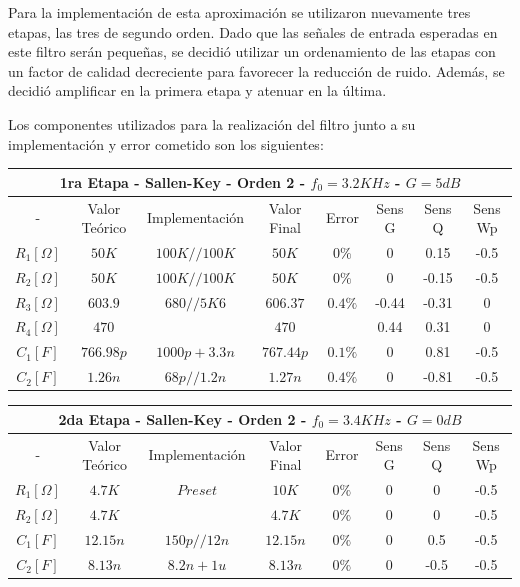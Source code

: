 Para la implementación de esta aproximación se utilizaron nuevamente tres etapas, las tres de segundo orden. Dado que las señales de entrada esperadas en este filtro serán pequeñas, se decidió utilizar un ordenamiento de las etapas con un factor de calidad decreciente para favorecer la reducción de ruido. Además, se decidió amplificar en la primera etapa y atenuar en la última.

Los componentes utilizados para la realización del filtro junto a su implementación y error cometido son los siguientes:

\begin{table}[H]
\centering
\begin{tabular}{@{}cccccccc@{}}
\multicolumn{8}{c}{1ra Etapa - Sallen-Key - Orden 2 - $f_0 = 3.2KHz$ - $G=5dB$} \\ \midrule
- & Valor Teórico & Implementación & Valor Final & Error & Sens G & Sens Q & Sens Wp \\ \midrule
$R_1 [\Omega]$ & $50K$ & $100K//100K$ & $50K$ & $0\%$ & 0 & 0.15 & -0.5 \\
$R_2 [\Omega]$ & $50K$ & $100K//100K$ & $50K$ & $0\%$ & 0 & -0.15 & -0.5 \\
$R_3 [\Omega]$ & $603.9$ & $680//5K6$ & $606.37$ & $0.4\%$ & -0.44 & -0.31 & 0 \\
$R_4 [\Omega]$ & $470$ &  & $470$ &  & 0.44 & 0.31 & 0 \\
$C_1 [F]$ & $766.98p$ & $1000p+3.3n$ & $767.44p$ & $0.1\%$ & 0 & 0.81 & -0.5 \\
$C_2 [F]$ & $1.26n$ & $68p//1.2n$ & $1.27n$ & $0.4\%$ & 0 & -0.81 & -0.5 \\ \bottomrule
\end{tabular}
\end{table}

\begin{table}[H]
\centering
\begin{tabular}{@{}cccccccc@{}}
\multicolumn{8}{c}{2da Etapa - Sallen-Key - Orden 2 - $f_0 = 3.4KHz$ - $G=0dB$} \\ \midrule
- & Valor Teórico & Implementación & Valor Final & Error & Sens G & Sens Q & Sens Wp \\ \midrule
$R_1 [\Omega]$ & $4.7K$ & $Preset$ & $10K$ & $0\%$ & 0 & 0 & -0.5 \\
$R_2 [\Omega]$ & $4.7K$ &  & $4.7K$ & $0\%$ & 0 & 0 & -0.5 \\
$C_1 [F]$ & $12.15n$ & $150p//12n$ & $12.15n$ & $0\%$ & 0 & 0.5 & -0.5 \\
$C_2 [F]$ & $8.13n$ & $8.2n+1u$ & $8.13n$ & $0\%$ & 0 & -0.5 & -0.5 \\ \bottomrule
\end{tabular}
\end{table}
 
